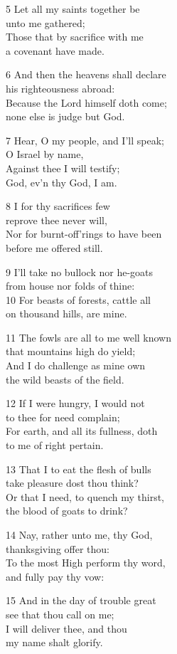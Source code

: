 5 Let all my saints together be\\
unto me gathered;\\
Those that by sacrifice with me\\
a covenant have made.

6 And then the heavens shall declare\\
his righteousness abroad:\\
Because the Lord himself doth come;\\
none else is judge but God.

7 Hear, O my people, and I’ll speak;\\
O Israel by name,\\
Against thee I will testify;\\
God, ev’n thy God, I am.

8 I for thy sacrifices few\\
reprove thee never will,\\
Nor for burnt-off’rings to have been\\
before me offered still.

9 I’ll take no bullock nor he-goats\\
from house nor folds of thine:\\
10 For beasts of forests, cattle all\\
on thousand hills, are mine.

11 The fowls are all to me well known\\
that mountains high do yield;\\
And I do challenge as mine own\\
the wild beasts of the field.

12 If I were hungry, I would not\\
to thee for need complain;\\
For earth, and all its fullness, doth\\
to me of right pertain.

13 That I to eat the flesh of bulls\\
take pleasure dost thou think?\\
Or that I need, to quench my thirst,\\
the blood of goats to drink?

14 Nay, rather unto me, thy God,\\
thanksgiving offer thou:\\
To the most High perform thy word,\\
and fully pay thy vow:

15 And in the day of trouble great\\
see that thou call on me;\\
I will deliver thee, and thou\\
my name shalt glorify.

